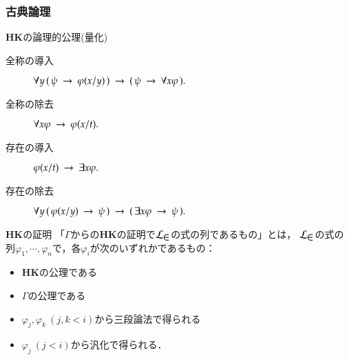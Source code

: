 \documentclass[dvipdfmx,10pt,notheorems]{beamer}
\theoremstyle{definition}
\newcommand{\lang}[1]{\mathcal{L}_{\scalebox{1.2}{$#1$}}} %
\newcommand{\rarrow}{\hspace{0.25em}\rightarrow\hspace{0.25em}} %
\begin{document}
\begin{frame}\frametitle{古典論理}
	\begin{alertblock}{{\bf HK}の論理的公理(量化)}
		\begin{description}
			\item[全称の導入] $\forall y\, (\, \psi \rarrow \varphi(x/y)\, ) 
				\rarrow (\, \psi \rarrow \forall x \varphi\, ).$
				
			\item[全称の除去] $\forall x \varphi \rarrow \varphi(x/t).$
				
			\item[存在の導入] $\varphi(x/t) \rarrow \exists x \varphi.$
				
			\item[存在の除去] $\forall y\, (\, \varphi(x/y) \rarrow \psi\, )
				\rarrow (\, \exists x \varphi \rarrow \psi\, ).$
		\end{description}
	\end{alertblock}
	
	\begin{exampleblock}{{\bf HK}の証明}
		「$\Gamma$からの{\bf HK}の証明で$\lang{\in}$の式の列であるもの」とは，
		$\lang{\in}$の式の列$\varphi_{1},\cdots,\varphi_{n}$で，各$\varphi_{i}$が次のいずれかであるもの：
		\begin{itemize}
			\item {\bf HK}の公理である
			\item $\Gamma$の公理である
			\item $\varphi_{j},\varphi_{k}\ (j,k < i)$から三段論法で得られる
			\item $\varphi_{j}\ (j < i)$から汎化で得られる．
		\end{itemize}
	\end{exampleblock}
\end{frame}
\end{document}
